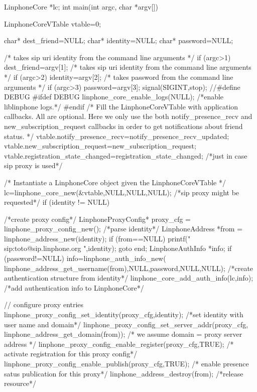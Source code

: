 \begin{DoxyCodeInclude}
LinphoneCore *lc;
int main(int argc, char *argv[]){
        LinphoneCoreVTable vtable={0};

        char* dest_friend=NULL;
        char* identity=NULL;
        char* password=NULL;

        /* takes   sip uri  identity from the command line arguments */
        if (argc>1){
                dest_friend=argv[1];
        }
        /* takes   sip uri  identity from the command line arguments */
        if (argc>2){
                identity=argv[2];
        }
        /* takes   password from the command line arguments */
        if (argc>3){
                password=argv[3];
        }
        signal(SIGINT,stop);
//#define DEBUG
#ifdef DEBUG
        linphone_core_enable_logs(NULL); /*enable liblinphone logs.*/
#endif
        /* 
         Fill the LinphoneCoreVTable with application callbacks.
         All are optional. Here we only use the both notify_presence_recv and
       new_subscription_request callbacks
         in order to get notifications about friend status.
         */
        vtable.notify_presence_recv=notify_presence_recv_updated;
        vtable.new_subscription_request=new_subscription_request;
        vtable.registration_state_changed=registration_state_changed; /*just in
       case sip proxy is used*/

        /*
         Instantiate a LinphoneCore object given the LinphoneCoreVTable
        */
        lc=linphone_core_new(&vtable,NULL,NULL,NULL);
        /*sip proxy might be requested*/
        if (identity != NULL)  {
                /*create proxy config*/
                LinphoneProxyConfig* proxy_cfg = linphone_proxy_config_new();
                /*parse identity*/
                LinphoneAddress *from = linphone_address_new(identity);
                if (from==NULL){
                        printf("%
       sip:toto@sip.linphone.org \n",identity);
                        goto end;
                }
                LinphoneAuthInfo *info;
                if (password!=NULL){
                        info=linphone_auth_info_new(
      linphone_address_get_username(from),NULL,password,NULL,NULL); /*create
       authentication structure from identity*/
                        linphone_core_add_auth_info(lc,info); /*add
       authentication info to LinphoneCore*/
                }

                // configure proxy entries
                linphone_proxy_config_set_identity(proxy_cfg,identity); /*set
       identity with user name and domain*/
                linphone_proxy_config_set_server_addr(proxy_cfg,
      linphone_address_get_domain(from)); /* we assume domain = proxy server address
      */
                linphone_proxy_config_enable_register(proxy_cfg,TRUE); /*
      activate registration for this proxy config*/
                linphone_proxy_config_enable_publish(proxy_cfg,TRUE); /* enable
       presence satus publication for this proxy*/
                linphone_address_destroy(from); /*release resource*/

}}
\end{DoxyCodeInclude}
